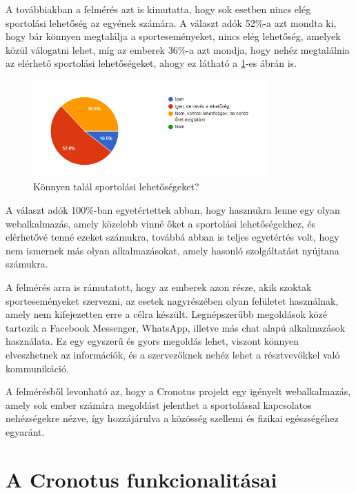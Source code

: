   A továbbiakban a felmérés azt is kimutatta, hogy sok esetben nincs elég sportolási lehetőség az egyének számára. 
  A választ adók 52\%-a azt mondta ki, hogy bár könnyen megtalálja a sporteseményeket, nincs elég lehetőség, amelyek közül válogatni lehet, míg
  az emberek 36\%-a azt mondja, hogy nehéz megtalálnia az elérhető sportolási lehetőségeket, ahogy ez látható a \ref{fig:do_you_find_options_to_sport}-es ábrán is.

  \begin{figure}[hb]
    \centering
    \includegraphics[width=0.8\textwidth]{./images/Screenshot 2024-04-12 165315.png}
    \caption{Könnyen talál sportolási lehetőségeket?}
    \label{fig:do_you_find_options_to_sport}
  \end{figure}

  A választ adók 100\%-ban egyetértettek abban, hogy hasznukra lenne egy olyan webalkalmazás, amely közelebb vinné őket a sportolási lehetőségekhez, 
  és elérhetővé tenné ezeket számukra, továbbá abban is teljes egyetértés volt, hogy nem ismernek más olyan alkalmazásokat,
  amely hasonló szolgáltatást nyújtana számukra.

  A felmérés arra is rámutatott, hogy az emberek azon része, akik szoktak sporteseményeket szervezni, az esetek nagyrészében 
  olyan felületet használnak, amely nem kifejezetten erre a célra készült. Legnépszerűbb megoldások közé tartozik a
  Facebook Messenger, WhatsApp, illetve más chat alapú alkalmazások használata. Ez egy egyszerű és gyors megoldás lehet, viszont 
  könnyen elveszhetnek az információk, és a szervezőknek nehéz lehet a résztvevőkkel való kommunikáció.

  A felmérésből levonható az, hogy a Cronotus projekt egy igényelt webalkalmazás, amely sok ember számára megoldást jelenthet
  a sportolással kapcsolatos nehézségekre nézve, így hozzájárulva a közösség szellemi és fizikai egészségéhez egyaránt.

\section{A Cronotus funkcionalitásai}

